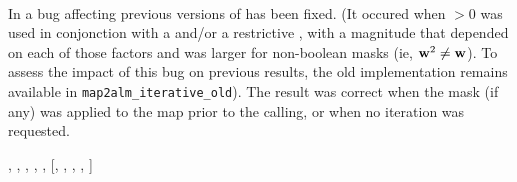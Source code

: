 \begin{facility}
{\\
In  a bug affecting previous versions of \thedocid{} has been fixed.
(It occured when 
$>0$ 
was used in conjonction with a 
and/or a restrictive 
, 
with a magnitude that depended on each of those factors and was larger for non-boolean masks (ie, $\textbf{w}^2 \ne \textbf{w}$).
To assess the impact of this bug on previous results, the old implementation remains available in 
\texttt{map2alm\_iterative\_old}). 
The result was correct when the mask (if any) was applied to the map prior to the 
\thedocid{} calling, or when no iteration was requested.}
{\modAlmTools}
\end{facility}

\begin{f90format}
{%
, %
, %
, %
, %
, %
 [, %
, %
 ,
%
, %
]}
\end{f90format}


